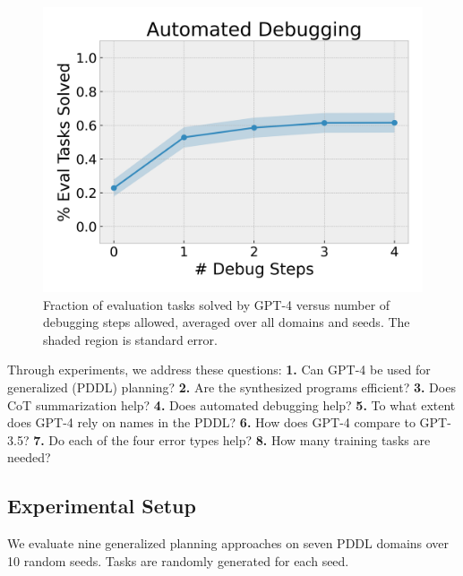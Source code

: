 \documentclass[letterpaper]{article} %
\begin{document}
\begin{figure}[t]
    \centering
    \includegraphics[width=0.6\columnwidth]{num_automated_debug.png}
    \caption{Fraction of evaluation tasks solved by GPT-4 versus number of debugging steps allowed, averaged over all domains and seeds. The shaded region is standard error.}
    \label{fig:automated_debugging}
\end{figure}





Through experiments, we address these questions:
\textbf{1.} Can GPT-4 be used for generalized (PDDL) planning?
\textbf{2.} Are the synthesized programs efficient?
\textbf{3.} Does CoT summarization help?
\textbf{4.} Does automated debugging help?
\textbf{5.} To what extent does GPT-4 rely on names in the PDDL?
\textbf{6.} How does GPT-4 compare to GPT-3.5?
\textbf{7.} Do each of the four error types help?
\textbf{8.} How many training tasks are needed?

\subsection{Experimental Setup}
We evaluate nine generalized planning approaches on seven PDDL domains over 10 random seeds.
Tasks are randomly generated for each seed.
\end{document}

